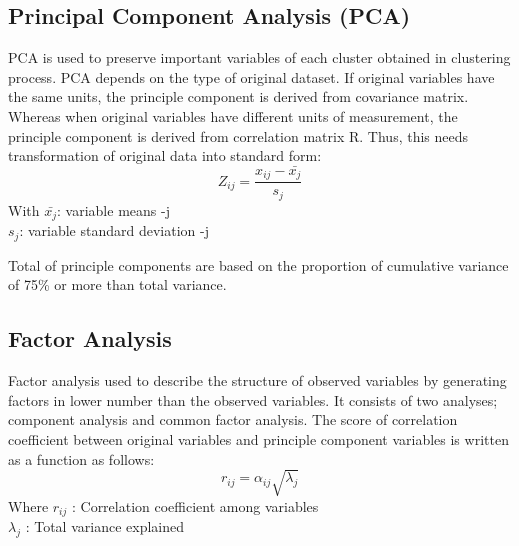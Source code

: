 \documentclass[conference]{IEEEtran}
\begin{document}
{\subsection{Principal Component Analysis (PCA)}
PCA is used to preserve important variables of each cluster obtained in clustering process. PCA depends on the type of original dataset. If original variables have the same units, the principle component is derived from covariance matrix. Whereas when original variables have different units of measurement, the principle component is derived from correlation matrix R. Thus, this needs transformation of original data into standard form:  
\begin{equation} \label{eq:5}
   Z_{ij} = \frac{x_{ij}-\bar{x_{j}}}{s_{j}}
\end{equation}
With $\bar{x_{j}}$:  variable means -j \\
\hspace*{7.5mm}  $s_{j}$:  variable standard deviation -j

Total of principle components are based on the proportion of cumulative variance of 75\% or more than total variance.


\subsection{Factor Analysis}
Factor analysis used to describe the structure of observed variables by generating factors in lower number than the observed variables. It consists of two analyses; component analysis and common factor analysis. The score of correlation coefficient between original variables and principle component variables is written as a function as follows:
\begin{equation}\label{eq:6}
    r_{ij}=\alpha_{ij}\sqrt{\lambda_{j}}
\end{equation}
Where   $r_{ij}$ : Correlation coefficient among variables
\\ \hspace*{1cm}    $\lambda_{j}$ :   Total variance explained

}
\end{document}
